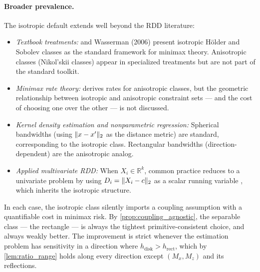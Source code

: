 \paragraph{Broader prevalence.}
The isotropic default extends well beyond the RDD literature:
\begin{itemize}
	\item \emph{Textbook treatments:} \textcite{tsybakov_introduction_2009} and Wasserman (2006) present isotropic Hölder and Sobolev classes as the standard framework for minimax theory.
	Anisotropic classes (Nikol'skii classes) appear in specialized treatments \parencite{nikolskii_approximation_1975,ibragimov_statistical_1981} but are not part of the standard toolkit.
	\item \emph{Minimax rate theory:} \textcite{stone_optimal_1980} derives rates for anisotropic classes, but the geometric relationship between isotropic and anisotropic constraint sets --- and the cost of choosing one over the other --- is not discussed.
	\item \emph{Kernel density estimation and nonparametric regression:} Spherical bandwidths (using $\lVert x - x'\rVert_2$ as the distance metric) are standard, corresponding to the isotropic class. Rectangular bandwidths (direction-dependent) are the anisotropic analog.
	\item \emph{Applied multivariate RDD:} When $X_i \in \mathbb{R}^k$, common practice reduces to a univariate problem by using $D_i = \lVert X_i - c\rVert_2$ as a scalar running variable \parencite[e.g.,][]{keele_geographic_2015}, which inherits the isotropic structure.
\end{itemize}
In each case, the isotropic class silently imports a coupling assumption with a quantifiable cost in minimax risk.
By \cref{prop:coupling_agnostic}, the separable class --- the rectangle --- is always the tightest primitive-consistent choice, and always weakly better.
The improvement is strict whenever the estimation problem has sensitivity in a direction where $h_{\mathrm{disk}} > h_{\mathrm{rect}}$, which by \cref{lem:ratio_range} holds along every direction except $(M_x, M_z)$ and its reflections.



